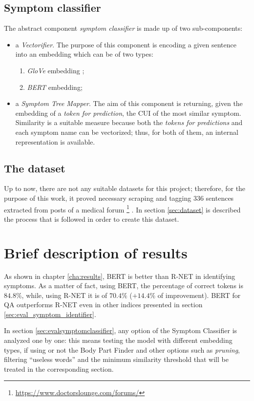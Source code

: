 \subsection*{Symptom classifier}
The abstract component \textit{symptom classifier} is made up of two sub-components:
\begin{itemize}
  \item a \textit{Vectorifier}. The purpose of this component is encoding a given sentence into an embedding which can be of two types:
  \begin{enumerate}
    \item \textit{GloVe} embedding \cite{glove};
    \item \textit{BERT} embedding;
  \end{enumerate}
  \item a \textit{Symptom Tree Mapper}. The aim of this component is returning, given the embedding of a \textit{token for prediction}, the CUI of the most similar symptom. Similarity is a suitable measure because both the \textit{tokens for predictions} and each symptom name can be vectorized; thus, for both of them, an internal representation is available.
\end{itemize}

\subsection*{The dataset}
\label{datasetintro}
Up to now, there are not any suitable datasets for this project; therefore, for the purpose of this work, it proved necessary scraping and tagging $336$ sentences extracted from posts of a medical forum \footnote{\url{https://www.doctorslounge.com/forums/}} \cite{doctorslounge}. In section \ref{sec:dataset} is described the process that is followed in order to create this dataset.

\section{Brief description of results}
\label{sec:brief_results}
As shown in chapter \ref{cha:results}, BERT is better than R-NET in identifying symptoms. As a matter of fact, using BERT, the percentage of correct tokens is $84.8 \%$, while, using R-NET it is of $70.4 \%$ ($+ 14.4 \%$ of improvement). BERT for QA outperforms R-NET even in other indices presented in section \ref{sec:eval_symptom_identifier}.

In section \ref{sec:evalsymptomclassifier}, any option of the Symptom Classifier is analyzed one by one: this means testing the model with different embedding types, if using or not the Body Part Finder and other options such as \textit{pruning}, filtering ``useless words'' and the minimum similarity threshold that will be treated in the corresponding section.
